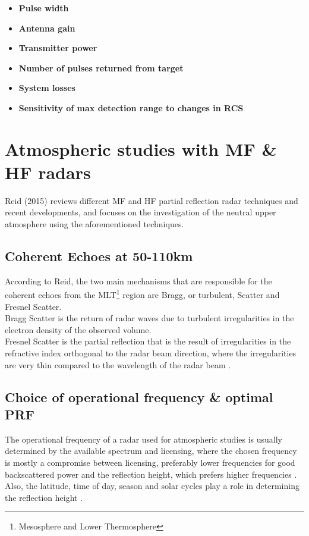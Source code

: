 \begin{itemize}
	\item \textbf{Pulse width}\newline
		
	\item \textbf{Antenna gain} \newline
	\item \textbf{Transmitter power}\newline
	\item \textbf{Number of pulses returned from target}\newline
	\item \textbf{System losses}\newline
	\item \textbf{Sensitivity of max detection range to changes in RCS}
\end{itemize}

\section{Atmospheric studies with MF \& HF radars}
Reid (2015) \citep{reid2015mf} reviews different MF and HF partial reflection radar techniques and recent developments, and focuses on the investigation of the neutral upper atmosphere using the aforementioned techniques.


\subsection{Coherent Echoes at 50-110km}
According to Reid, the two main mechanisms that are responsible for the coherent echoes from the MLT\footnote{Mesosphere and Lower Thermosphere} region are Bragg, or turbulent, Scatter and Fresnel Scatter. \\
Bragg Scatter is the return of radar waves due to turbulent irregularities in the electron density of the observed volume. \\
Fresnel Scatter is the partial reflection that is the result of irregularities in the refractive index orthogonal to the radar beam direction, where the irregularities are very thin compared to the wavelength of the radar beam \citep{reid2015mf}.

\subsection{Choice of operational frequency \& optimal PRF}

The operational frequency of a radar used for atmospheric studies is usually determined by the available spectrum and licensing, where the chosen frequency is mostly a compromise between licensing, preferably lower frequencies for good backscattered power and the reflection height, which prefers higher frequencies \citep{reid2015mf}. Also, the latitude, time of day, season and solar cycles play a role in determining the reflection height \citep{jursa1985handbook}.

